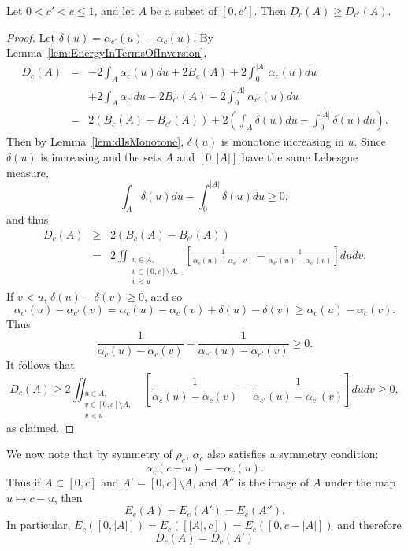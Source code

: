 \begin{lemma} \label{lem:canShrinkOneEnd}
    Let $0<c'<c\leq 1$, and let $A$ be a subset of $[0,c']$.  Then $D_c(A)\geq D_{c'}(A)$.
\end{lemma}
\begin{proof}
    Let $\delta(u) = \alpha_{c'} (u)  - \alpha_c(u)$.   By Lemma~\ref{lem:EnergyInTermsOfInversion}, \begin{eqnarray*}
    D_c(A) &=&  -2 \int_{A} \alpha_c(u)du + 2B_c(A) + 2 \int_{0}^{|A|} \alpha_{c}(u) du   \\
        & & + 2\int_{A} \alpha_{c'} du - 2B_{c'} (A) - 2\int_{0}^{|A|} \alpha_{c'}(u) du \\
        &=& 2 (B_{c}(A)-B_{c'}(A)) + 2\left( \int_A \delta(u) du - \int_{0}^{|A|} \delta(u) du\right).
    \end{eqnarray*}
    Then by Lemma~\ref{lem:dIsMonotone}, $\delta(u)$ is monotone increasing in $u$. 
    Since $\delta(u)$ is increasing and the sets $A$ and $[0,|A|]$ have the same Lebesgue measure, $$  \int_A \delta(u) du - \int_{0}^{|A|} \delta(u) du \geq 0,
    $$ and thus 
    \begin{eqnarray*}
        D_c(A)&\geq&  2 (B_{c}(A)-B_{c'}(A)) \\
        &=& 2 \iint_{\substack{u\in A,\\v\in [0,c]\setminus A,\\ v<u}}\left[ \frac{1}{\alpha_c(u)-\alpha_c(v)}  - \frac{1}{\alpha_{c'}(u)-\alpha_{c'}(v)}  \right]dudv.
    \end{eqnarray*}
    If  $v<u$, $\delta(u)-\delta(v)\geq 0$, and so 
    $$\alpha_{c'}(u) - \alpha_{c'}(v)  = \alpha_c(u) -\alpha_c(v) + \delta(u) - \delta (v) \geq \alpha_c(u)-\alpha_c(v).$$ Thus 
    $$
        \frac{1}{\alpha_c(u)-\alpha_c(v)}  - \frac{1}{\alpha_{c'}(u)-\alpha_{c'}(v)} \geq 0.  
    $$
    It follows that $$
    D_c(A) \geq 2\iint_{\substack{u\in A,\\v\in [0,c]\setminus A,\\ v<u}}\left[ \frac{1}{\alpha_c(u)-\alpha_c(v)}  - \frac{1}{\alpha_{c'}(u)-\alpha_{c'}(v)}  \right]dudv\geq 0,
    $$
    as claimed.
\end{proof}

We now note that by symmetry of $\rho_c$,  $\alpha_c$ also satisfies a symmetry condition: $$\alpha_c(c-u) = -\alpha_c(u).$$  Thus if $A\subset [0,c]$ and $A' = [0,c]\setminus A$, and $A''$ is the image of $A$ under the map $u\mapsto c-u$, then $$
    E_c(A)=E_c(A') = E_c(A''). 
$$ In particular, $E_c([0,|A|]) = E_{c}([|A|,c]) = E_c([0,c-|A|])$ and therefore 
\begin{equation}
    D_c(A) =  D_c(A') \label{eq:DcVsComplement}
\end{equation}


